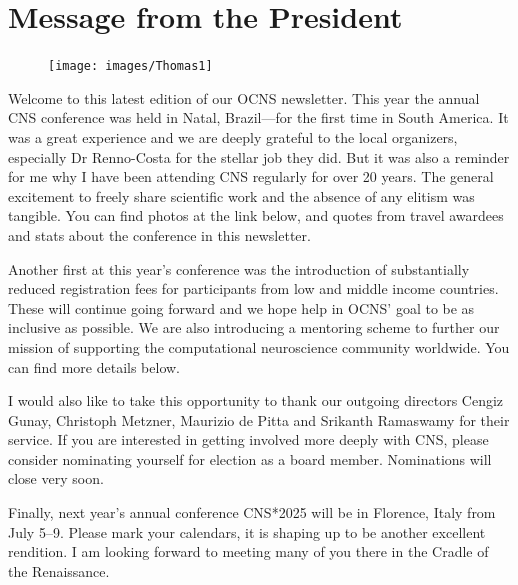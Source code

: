 \documentclass[11pt,a4paper,oneside]{article}
\begin{document}

\clearpage

\pagestyle{fancy}
\fancyhead{}
\fancyfoot{}

\clearpage
\pagecolor{ocnspagecolor}
\section*{Message from the President}%
\begin{figure}
  \texttt{[image: images/Thomas1]}
\end{figure}

Welcome to this latest edition of our OCNS newsletter. This year the annual CNS conference was held in Natal, Brazil---for the first time in South America. It was a great experience and we are deeply grateful to the local organizers, especially Dr Renno-Costa for the stellar job they did. But it was also a reminder for me why I have been attending CNS regularly for over 20 years. The general excitement to freely share scientific work and the absence of any elitism was tangible. You can find photos at the link below, and quotes from travel awardees and stats about the conference in this newsletter.

Another first at this year's conference was the introduction of substantially reduced registration fees for participants from low and middle income countries. These will continue going forward and we hope help in OCNS' goal to be as inclusive as possible. We are also introducing a mentoring scheme to further our mission of supporting the computational neuroscience community worldwide. You can find more details below.

I would also like to take this opportunity to thank our outgoing directors Cengiz Gunay, Christoph Metzner, Maurizio de Pitta and Srikanth Ramaswamy for their service. If you are interested in getting involved more deeply with CNS, please consider nominating yourself for election as a board member. Nominations will close very soon.

Finally, next year's annual conference CNS*2025 will be in Florence, Italy from July 5--9. Please mark your calendars, it is shaping up to be another excellent rendition. I am looking forward to meeting many of you there in the Cradle of the Renaissance.

\vspace{2ex}
\end{document}
